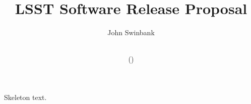 \documentclass[letterpaper]{scrartcl}
\title{LSST Software Release Proposal}
\author{John Swinbank}
\date{\vcsdate\\\small{(\texttt{\vcsrevision})}}
\begin{document}
\maketitle

Skeleton text.
\end{document}

